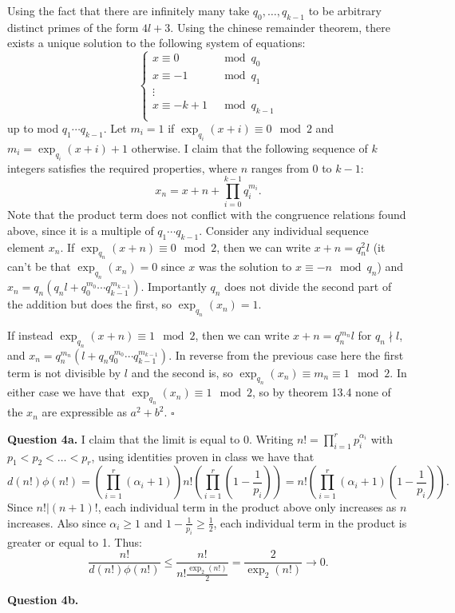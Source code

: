 \documentclass[letterpaper, reqno,11pt]{article}
\begin{document}
Using the fact that there are infinitely many take $q_0,\ldots, q_{k-1}$ to be arbitrary distinct primes of the form $4l+3$. Using the chinese remainder theorem, there exists a unique solution to the following system of equations:
\[
\begin{cases}
    
    x\equiv 0&\mod q_0\\
    x\equiv -1&\mod q_1\\
\vdots\\
    x\equiv -k+1&\mod q_{k-1}\\
\end{cases}
\]
up to mod $q_1\cdots q_{k-1}$. Let $m_i=1$ if $\exp_{q_i}(x+i)\equiv 0\mod 2$ and $m_i=\exp_{q_i}(x+i)+1$ otherwise. I claim that the following sequence of $k$ integers satisfies the required properties, where $n$ ranges from 0 to $k-1$:
\[
    x_n=x+n+\prod_{i=0}^{k-1}q_i^{m_i}
.\]
Note that the product term does not conflict with the congruence relations found above, since it is a multiple of $q_1\cdots q_{k-1}$. Consider any individual sequence element $x_n$. If $\exp_{q_{n}}(x+n)\equiv 0\mod 2$, then we can write $x+n=q_n^2l$ (it can't be that $\exp_{q_n}(x_n)=0$ since $x$ was the solution to $x\equiv -n\mod q_n$) and $x_n=q_n(q_nl+q_0^{m_0}\cdots q_{k-1}^{m_{k-1}})$. Importantly $q_n$ does not divide the second part of the addition but does the first, so $\exp_{q_n}(x_n)=1$.

If instead $\exp_{q_{n}}(x+n)\equiv 1\mod 2$, then we can write $x+n=q_n^{m_n}l$ for $q_n\nmid l$, and $x_n=q_n^{m_n}(l+q_nq_0^{m_0}\cdots q_{k-1}^{m_{k-1}})$. In reverse from the previous case here the first term is not divisible by $l$ and the second is, so $\exp_{q_n}(x_n)\equiv m_n\equiv 1\mod 2$. In either case we have that $\exp_{q_n}(x_n)\equiv 1\mod 2$, so by theorem 13.4 none of the $x_n$ are expressible as $a^2+b^2$. $\square$

{\medskip\noindent\bf Question 4a.} I claim that the limit is equal to 0. Writing $n!=\prod_{i=1}^{r}p_i^{\alpha_i}$ with $p_1<p_2<\ldots<p_r$, using identities proven in class we have that
\[
d(n!)\phi(n!)=\left(\prod_{i=1}^{r}(\alpha_i+1)\right)n!\left(\prod_{i=1}^{r}\left(1-\frac{1}{p_i}\right)\right)=n!\left( \prod_{i=1}^{r}(\alpha_i+1)\left( 1-\frac{1}{p_i} \right)  \right) 
.\]
Since $n!|(n+1)!$, each individual term in the product above only increases as $n$ increases. Also since $\alpha_i\geq 1$ and $1-\frac{1}{p_i}\geq \frac{1}{2}$, each individual term in the product is greater or equal to 1. Thus:
\[
    \frac{n!}{d(n!)\phi(n!)}\leq \frac{n!}{n! \frac{\exp_2(n!)}{2}}=\frac{2}{\exp_2(n!)} \to 0
.\]

{\medskip\noindent\bf Question 4b.} 
\end{document}

